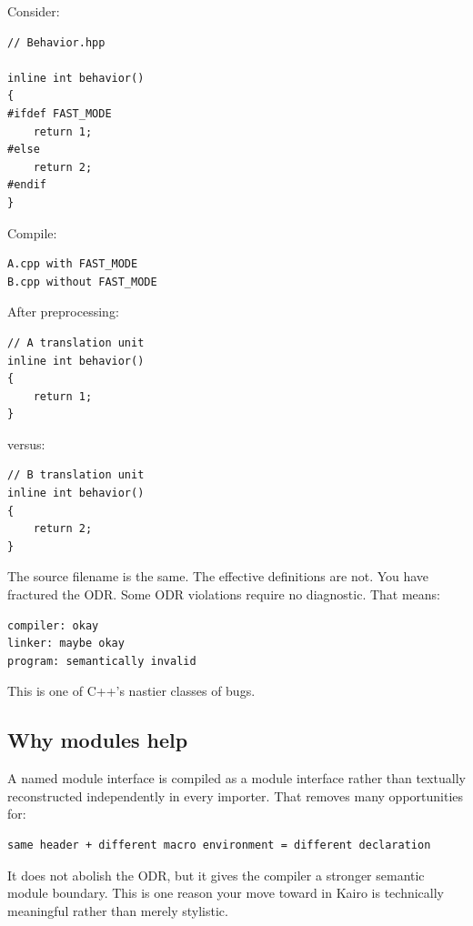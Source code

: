 \hypertarget{01-foundations-i-ch002-the-evil-odr-bug-definitions-that-look-like-the-same-header-but-arent}{}

Consider:

\begin{verbatim}
// Behavior.hpp

inline int behavior()
{
#ifdef FAST_MODE
    return 1;
#else
    return 2;
#endif
}
\end{verbatim}

Compile:

\begin{verbatim}
A.cpp with FAST_MODE
B.cpp without FAST_MODE
\end{verbatim}

After preprocessing:

\begin{verbatim}
// A translation unit
inline int behavior()
{
    return 1;
}
\end{verbatim}

versus:

\begin{verbatim}
// B translation unit
inline int behavior()
{
    return 2;
}
\end{verbatim}

The source filename is the same. The effective definitions are not. You have fractured the ODR. Some ODR violations require no diagnostic. That means:

\begin{verbatim}
compiler: okay
linker: maybe okay
program: semantically invalid
\end{verbatim}

This is one of C++'s nastier classes of bugs.

\subsection{Why modules help}\label{01-foundations-i-ch002-why-modules-help}

\hypertarget{01-foundations-i-ch002-why-modules-help}{}

A named module interface is compiled as a module interface rather than textually reconstructed independently in every importer. That removes many opportunities for:

\begin{verbatim}
same header + different macro environment = different declaration
\end{verbatim}

It does not abolish the ODR, but it gives the compiler a stronger semantic module boundary. This is one reason your move toward  in Kairo is technically meaningful rather than merely stylistic.

